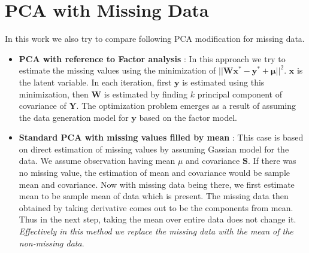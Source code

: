 \section{PCA with Missing Data}
In this work we also try to compare following PCA modification for missing data. 
\begin{itemize}
\item \textbf{PCA with reference to Factor analysis} : In this approach we try to estimate the missing values using the minimization of $||\mathbf{Wx^*-y^*+\mu}||^2$. $\mathbf{x}$ is the latent variable. In each iteration, first $\mathbf{y}$ is estimated using this minimization, then $\mathbf{W}$ is estimated by finding $k$ principal component of covariance of $\mathbf{Y}$. The optimization problem emerges as a result of assuming the data generation model for $\mathbf{y}$ based on the factor model.
\item \textbf{Standard PCA with missing values filled by mean} : This case is based on direct estimation of missing values by assuming Gassian model for the data. We assume observation having mean $\mu$ and covariance $\mathbf{S}$. If there was no missing value, the estimation of mean and covariance would be sample mean and covariance. Now with missing data being there, we first estimate mean to be sample mean of data which is present. The missing data then obtained by taking derivative comes out to be the components from mean. Thus in the next step, taking the mean over entire data does not change it. \emph{Effectively in this method we replace the missing data with the mean of the non-missing data}.
\end{itemize}